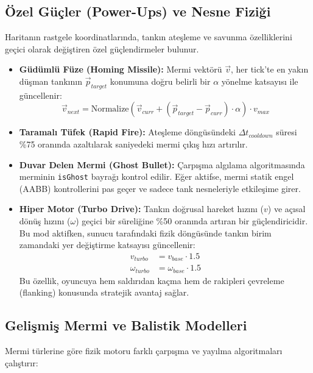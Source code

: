 \documentclass[12pt,a4paper]{article}
\begin{document}
\subsection{Özel Güçler (Power-Ups) ve Nesne Fiziği}
Haritanın rastgele koordinatlarında, tankın ateşleme ve savunma özelliklerini geçici olarak değiştiren özel güçlendirmeler bulunur.

\begin{itemize}
      \item \textbf{Güdümlü Füze (Homing Missile):} Mermi vektörü $\vec{v}$, her tick'te en yakın düşman tankının $\vec{p}_{target}$ konumuna doğru belirli bir $\alpha$ yönelme katsayısı ile güncellenir:
            \[ \vec{v}_{next} = \text{Normalize}(\vec{v}_{curr} + (\vec{p}_{target} - \vec{p}_{curr}) \cdot \alpha) \cdot v_{max} \]
      \item \textbf{Taramalı Tüfek (Rapid Fire):} Ateşleme döngüsündeki $\Delta t_{cooldown}$ süresi \%75 oranında azaltılarak saniyedeki mermi çıkış hızı artırılır.
      \item \textbf{Duvar Delen Mermi (Ghost Bullet):} Çarpışma algılama algoritmasında merminin \texttt{isGhost} bayrağı kontrol edilir. Eğer aktifse, mermi statik engel (AABB) kontrollerini pas geçer ve sadece tank nesneleriyle etkileşime girer.
      \item \textbf{Hiper Motor (Turbo Drive):} Tankın doğrusal hareket hızını ($v$) ve açısal dönüş hızını ($\omega$) geçici bir süreliğine \%50 oranında artıran bir güçlendiricidir. Bu mod aktifken, sunucu tarafındaki fizik döngüsünde tankın birim zamandaki yer değiştirme katsayısı güncellenir:
            \begin{align*}
                  v_{turbo}      & = v_{base} \cdot 1.5      \\
                  \omega_{turbo} & = \omega_{base} \cdot 1.5
            \end{align*}
            Bu özellik, oyuncuya hem saldırıdan kaçma hem de rakipleri çevreleme (flanking) konusunda stratejik avantaj sağlar.
\end{itemize}

\subsection{Gelişmiş Mermi ve Balistik Modelleri}
Mermi türlerine göre fizik motoru farklı çarpışma ve yayılma algoritmaları çalıştırır:
\end{document}

